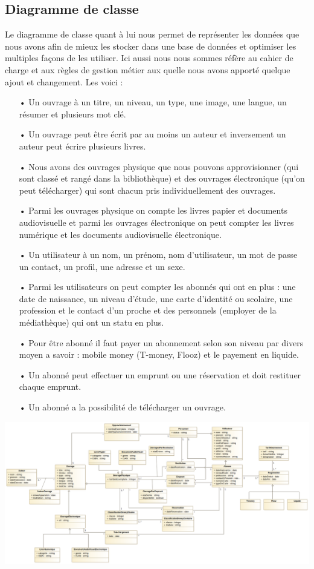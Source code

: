 \documentclass[12pt,a4paper]{article}
\begin{document}
\subsection{Diagramme de classe}
Le diagramme de classe quant à lui nous permet de représenter les données que nous 
avons afin de mieux les stocker dans une base de données et optimiser les multiples
façons de les utiliser. Ici aussi nous nous sommes réfère au cahier de charge et 
aux règles de gestion métier aux quelle nous avons apporté quelque ajout et changement.
Les voici :
\begin{itemize}
\item[•] Un ouvrage à un titre, un niveau, un type, une image, une langue, un résumer et
plusieurs mot clé.
\item[•] Un ouvrage peut être écrit par au moins un auteur et inversement un auteur peut
écrire plusieurs livres.
\item[•] Nous avons des ouvrages physique que nous pouvons approvisionner (qui sont
classé et rangé dans la bibliothèque) et des ouvrages électronique (qu'on peut 
télécharger) qui sont chacun pris individuellement des ouvrages.
\item[•] Parmi les ouvrages physique on compte les livres papier et documents
audiovisuelle et parmi les ouvrages électronique on peut compter les livres numérique
et les documents audiovisuelle électronique.
\item[•] Un utilisateur à un nom, un prénom, nom d'utilisateur, un mot de passe un 
contact, un profil, une adresse et un sexe.
\item[•] Parmi les utilisateurs on peut compter les abonnés qui ont en plus : une date
de naissance, un niveau d'étude, une carte d'identité ou scolaire, une profession et le
contact d'un proche et des personnels (employer de la médiathèque) qui ont un statu en 
plus. 
\item[•] Pour être abonné il faut payer un abonnement selon son niveau par divers moyen
a savoir : mobile money (T-money, Flooz) et le payement en liquide.
\item[•] Un abonné peut effectuer un emprunt ou une réservation et doit restituer
chaque emprunt.
\item[•] Un abonné a la possibilité de télécharger un ouvrage.
\end{itemize}
\newpage
\includegraphics[scale=0.25]{images/CD.png}
\newpage
\end{document}
